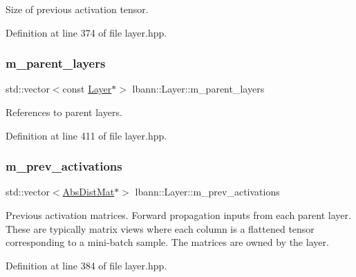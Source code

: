 Size of previous activation tensor. 

Definition at line 374 of file layer.\+hpp.

\mbox{\label{classlbann_1_1Layer_a3fa7c6cf1a22bb14ab0e85e3dc6027c5}} 
\subsubsection{\texorpdfstring{m\+\_\+parent\+\_\+layers}{m\_parent\_layers}}
{\footnotesize\ttfamily std\+::vector$<$const \hyperlink{classlbann_1_1Layer}{Layer}$\ast$$>$ lbann\+::\+Layer\+::m\+\_\+parent\+\_\+layers\hspace{0.3cm}{\ttfamily [protected]}}

References to parent layers. 

Definition at line 411 of file layer.\+hpp.

\mbox{\label{classlbann_1_1Layer_a52314601c3458268f56e017dc2ade357}} 
\subsubsection{\texorpdfstring{m\+\_\+prev\+\_\+activations}{m\_prev\_activations}}
{\footnotesize\ttfamily std\+::vector$<$\hyperlink{base_8hpp_a9a697a504ae84010e7439ffec862b470}{Abs\+Dist\+Mat}$\ast$$>$ lbann\+::\+Layer\+::m\+\_\+prev\+\_\+activations\hspace{0.3cm}{\ttfamily [protected]}}

Previous activation matrices. Forward propagation inputs from each parent layer. These are typically matrix views where each column is a flattened tensor corresponding to a mini-\/batch sample. The matrices are owned by the layer. 

Definition at line 384 of file layer.\+hpp.

\mbox{\label{classlbann_1_1Layer_a6fdcbf884150d0b20cffe678fefd7caa}} 
